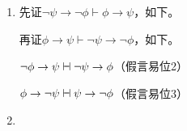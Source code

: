 \documentclass[punct=custom/kaiming,fontset=none]{ctexart}
\makeatletter
\newcommand*{\vdashv}{\mathrel{\ooalign{$\vdash$\cr\hskip1pt\reflectbox{$\vdash$}}}}
\renewenvironment{proof}[1][\proofname]{\par
  \pushQED{\qed}%
  \normalfont \topsep6\p@\@plus6\p@\relax
  \trivlist
  \item[\hskip\labelsep
    \bfseries
    #1%
    ]\ignorespaces
}{%
  \popQED\endtrivlist\@endpefalse
}
\let\proves\vdash
\makeatother
\begin{document}
\begin{description}
\begin{enumerate}
\begin{proof}
        先证\(\neg\psi \to \neg\phi \proves \phi \to \psi\)，如下。
        \begin{ND}
          \label{1}
          \label{2}
        \end{ND}
        再证\(\phi \to \psi \proves \neg\psi \to \neg\phi\)，如下。
        \begin{ND}
          \ndl{}{}{}
        \end{ND}
      \end{proof}
      \(\neg\phi \to \psi \vdashv \neg\psi \to \phi\)\hfill（假言易位2）

      \(\phi \to \neg\psi \vdashv \psi \to \neg\phi\)\hfill（假言易位3）
    \item 
    \end{enumerate}
\end{description}
\end{document}
